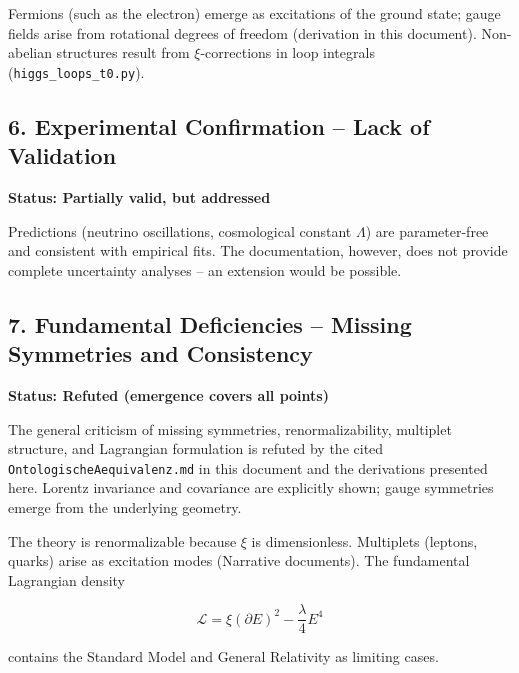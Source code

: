 	Fermions (such as the electron) emerge as excitations of the ground state; gauge fields arise from rotational degrees of freedom (derivation in this document). Non-abelian structures result from \(\xi\)-corrections in loop integrals (\texttt{higgs\_loops\_t0.py}).
	
	\subsection{6. Experimental Confirmation – Lack of Validation}
	\textbf{Status: Partially valid, but addressed}
	
Predictions (neutrino oscillations, cosmological constant \(\Lambda\)) are parameter-free and consistent with empirical fits. The documentation, however, does not provide complete uncertainty analyses – an extension would be possible.
	
	\subsection{7. Fundamental Deficiencies – Missing Symmetries and Consistency}
	\textbf{Status: Refuted (emergence covers all points)}
	
	The general criticism of missing symmetries, renormalizability, multiplet structure, and Lagrangian formulation is refuted by the cited \texttt{OntologischeAequivalenz.md} in this document and the derivations presented here. Lorentz invariance and covariance are explicitly shown; gauge symmetries emerge from the underlying geometry.
	
	The theory is renormalizable because \(\xi\) is dimensionless. Multiplets (leptons, quarks) arise as excitation modes (Narrative documents). The fundamental Lagrangian density
	
	\[
	\mathcal{L} = \xi (\partial E)^2 - \frac{\lambda}{4} E^4
	\]
	
	contains the Standard Model and General Relativity as limiting cases.